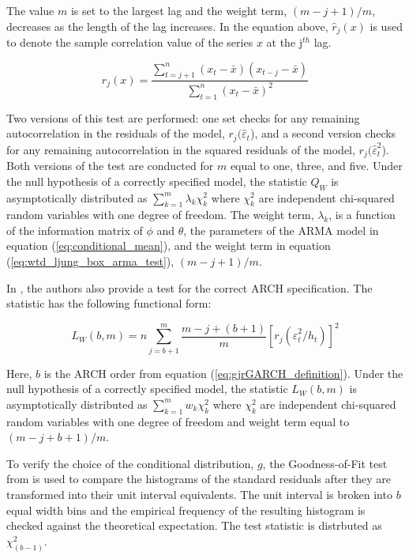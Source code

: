 The value $m$ is set to the largest lag and the weight term, $(m - j + 1) / m$, decreases as the length of the lag increases. In the equation above, $\hat{r}_{j}(x)$ is used to denote the sample correlation value of the series $x$ at the j$^{th}$ lag.

\begin{equation} \label{eq:sample_correlation}
	r_{j}(x) = \frac{\sum_{t=j+1}^{n} (x_{t} - \bar{x}) (x_{t-j} - \bar{x})}{\sum_{t=1}^{n} (x_{t} - \bar{x})^{2}}
\end{equation}

Two versions of this test are performed: one set checks for any remaining autocorrelation in the residuals of the model, $r_{j}(\hat{\varepsilon}_{t}$), and a second version checks for any remaining autocorrelation in the squared residuals of the model, $r_{j}(\hat{\varepsilon}_{t}^{2}$). Both versions of the test are conducted for $m$ equal to one, three, and five. Under the null hypothesis of a correctly specified model, the statistic $Q_{W}$ is asymptotically distributed as $\sum_{k=1}^{m} \lambda_{k} \chi_{k}^{2}$ where $\chi_{k}^{2}$ are independent chi-squared random variables with one degree of freedom. The weight term, $\lambda_{k}$, is a function of the information matrix of $\phi$ and $\theta$, the parameters of the ARMA model in equation (\ref{eq:conditional_mean}), and the weight term in equation (\ref{eq:wtd_ljung_box_arma_test}), $(m - j + 1) / m$.

In \cite{Fisher_Gallagher_2012}, the authors also provide a test for the correct ARCH specification. The statistic has the following functional form:

\begin{equation}
	L_{W}(b,m) = n \sum_{j=b+1}^{m} \frac{m - j + (b + 1)}{m} [r_{j} \left( \hat{\varepsilon}_{t}^{2} / h_{t} \right)]^{2} 
\end{equation}

Here, $b$ is the ARCH order from equation (\ref{eq:gjrGARCH_definition}). Under the null hypothesis of a correctly specified model, the statistic $L_{W}(b,m)$ is asymptotically distributed as $\sum_{k=1}^{m} w_{k} \chi_{k}^{2}$ where $\chi_{k}^{2}$ are independent chi-squared random variables with one degree of freedom and weight term equal to $(m - j + b + 1) / m$.

To verify the choice of the conditional distribution, $g$, the Goodness-of-Fit test from \cite{VlaadPalm1993} is used to compare the histograms of the standard residuals after they are transformed into their unit interval equivalents. The unit interval is broken into $b$ equal width bins and the empirical frequency of the resulting histogram is checked against the theoretical expectation. The test statistic is distrbuted as $\chi^{2}_{(b-1)}$.

